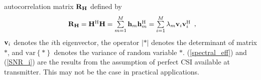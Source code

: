 \documentclass[10pt,fleqn, twocolumn]{IEEEtran}
\newcommand{\bh}{{\bf h}}
\newcommand{\bH}{{\bf H}}
\newcommand{\bv}{{\bf v}}
\newcommand{\bR}{{\bf R}}
\begin{document}
autocorrelation matrix $\bR_{\bH}$ defined by
\begin{equation}
\begin{array}{l}
\bR_{\bH}=\bH^{\rm H}\bH=\sum\limits_{m=1}^{M}\bh_{m}\bh_{m}^{\rm
H}=\sum\limits_{i=1}^{M}\lambda_{m}\bv_{i}\bv_{i}^{\rm H}
\end{array},\label{R_h}
\end{equation}
\noindent $\bv_{i}$ denotes the $i$th eigenvector, the operator
$\left|\ast\right|$ denotes the determinant of matrix $\ast$, and
$\mbox{var}\left\{\ast\right\}$ denotes the variance of random
variable $\ast$. (\ref{spectral_eff}) and (\ref{SNR_i}) are the
results from the assumption of perfect CSI available at
transmitter. This may not be the case in practical applications.
\begin{figure}
\end{figure}
\end{document}

